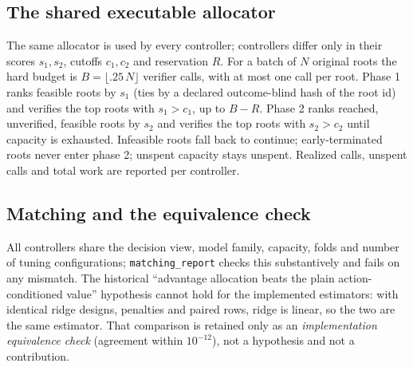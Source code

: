 \subsection{The shared executable allocator}
\label{sec:b-allocator}

The same allocator is used by every controller; controllers differ only in their
scores $s_1,s_2$, cutoffs $c_1,c_2$ and reservation $R$.  For a batch of $N$
original roots the hard budget is $B=\lfloor .25\,N\rfloor$ verifier calls, with
at most one call per root.  Phase 1 ranks feasible roots by $s_1$ (ties by a
declared outcome-blind hash of the root id) and verifies the top roots with
$s_1>c_1$, up to $B-R$.  Phase 2 ranks reached, unverified, feasible roots by
$s_2$ and verifies the top roots with $s_2>c_2$ until capacity is exhausted.
Infeasible roots fall back to continue; early-terminated roots never enter phase
2; unspent capacity stays unspent.  Realized calls, unspent calls and total work
are reported per controller.

\subsection{Matching and the equivalence check}
\label{sec:b-equivalence}

All controllers share the decision view, model family, capacity, folds and number
of tuning configurations; \texttt{matching\_report} checks this substantively and
fails on any mismatch.  The historical ``advantage allocation beats the plain
action-conditioned value'' hypothesis cannot hold for the implemented
estimators: with identical ridge designs, penalties and paired rows, ridge is
linear, so the two are the same estimator.  That comparison is retained only as
an \emph{implementation equivalence check} (agreement within $10^{-12}$), not a
hypothesis and not a contribution.
